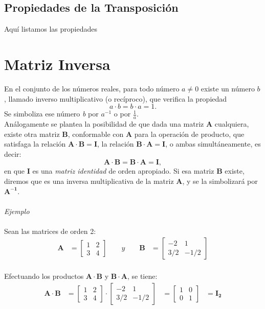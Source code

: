 \documentclass[a4paper,12pt]{report} %
\begin{document}
\subsection{Propiedades de la Transposición}
Aquí listamos las propiedades
\\
\section{Matriz Inversa}
En el conjunto de los números reales, para todo número \(\mathit{a}\neq 0\) existe un número \(\mathit{b}\), llamado inverso multiplicativo (o recíproco), que verifica la propiedad
\[
\mathit{a} \cdot \mathit{b} = \mathit{b} \cdot \mathit{a} = 1.
\]
Se simboliza ese número \textit{b} por \(\mathit{a^{-1}}\) o por \(\frac{1}{a}\).\\
Análogamente se plantea la posibilidad de que dada una matriz \textbf{A} cualquiera, existe otra matriz \textbf{B}, conformable con \textbf{A} para la operación de producto, que satisfaga la relación \(\mathbf{A \cdot B = I}\), la relación \(\mathbf{B \cdot A = I}\), o ambas simultáneamente, es decir:
\[
\mathbf{A \cdot B = B \cdot A = I},
\]
en que \textbf{I} es una \textit{matriz identidad} de orden apropiado. Si esa matriz \textbf{B} existe, diremos que es una inversa multiplicativa de la matriz \textbf{A}, y se la simbolizará por \(\mathbf{A^{-1}}\).
\\ \\
\textit{Ejemplo} \\ \\
Sean las matrices de orden 2:
\[
\begin{aligned}
\mathbf{A} &= \begin{bmatrix}
    1 & 2 \\
    3 & 4 
\end{bmatrix}
\qquad
y
\qquad
\mathbf{B} &= \begin{bmatrix}
    -2 & 1 \\
    3/2 & -1/2
\end{bmatrix}
\end{aligned}
\]\\ 
Efectuando los productos \(\mathbf{A\cdot B}\) y \(\mathbf{B\cdot A}\), se tiene:\\ 
\[
\begin{aligned}
\mathbf{A\cdot B} &= \begin{bmatrix}
    1 & 2 \\
    3 & 4 
\end{bmatrix}
\cdot
\begin{bmatrix}
    -2 & 1 \\
    3/2 & -1/2
\end{bmatrix}
&= \begin{bmatrix}
    1 & 0 \\
    0 & 1 
\end{bmatrix}
&= \mathbf{I_{2}}
\end{aligned}
\]\\
\end{document}
